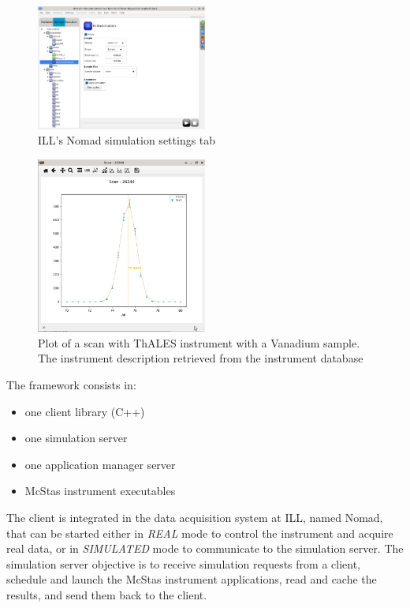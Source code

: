 \documentclass[11pt, a4paper]{article}
\begin{document}
\begin{figure}[htbp]
\includegraphics[width=0.5\textwidth]{figures/McStas-settings.png}
\caption{ILL's Nomad simulation settings tab}
\label{fig:Nomad_sim_settings}
\end{figure}
\begin{figure}[htbp]
\includegraphics[width=0.5\textwidth]{figures/McStas-scan-plot.png}
\caption{Plot of a scan with ThALES instrument with a Vanadium sample. The instrument description retrieved from the instrument database}
\label{fig:Nomad_ThALES_vanadium_scan}
\end{figure}


The framework consists in:
\begin{itemize}
\item one client library (C++)
\item one simulation server
\item one application manager server
\item McStas instrument executables
\end{itemize}

The client is integrated in the data acquisition system at ILL, named Nomad, that can be started either in \emph{REAL} mode to control the instrument and acquire real data, or in \emph{SIMULATED} mode to communicate to the simulation server.
The simulation server objective is to receive simulation requests from a client, schedule and launch the McStas instrument applications, read and cache the results, and send them back to the client.
\end{document}
